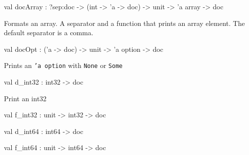 \documentclass[11pt]{article}
\begin{document}
\label{val:Pretty.docArray}\begin{ocamldoccode}
val docArray : ?sep:doc ->
  (int -> 'a -> doc) -> unit -> 'a array -> doc
\end{ocamldoccode}
\begin{ocamldocdescription}
Formats an array. A separator and a function that prints an array
    element. The default separator is a comma.


\end{ocamldocdescription}




\label{val:Pretty.docOpt}\begin{ocamldoccode}
val docOpt : ('a -> doc) -> unit -> 'a option -> doc
\end{ocamldoccode}
\begin{ocamldocdescription}
Prints an {\tt{'a option}} with {\tt{None}} or {\tt{Some}}


\end{ocamldocdescription}




\label{val:Pretty.d-underscoreint32}\begin{ocamldoccode}
val d_int32 : int32 -> doc
\end{ocamldoccode}
\begin{ocamldocdescription}
Print an int32


\end{ocamldocdescription}




\label{val:Pretty.f-underscoreint32}\begin{ocamldoccode}
val f_int32 : unit -> int32 -> doc
\end{ocamldoccode}




\label{val:Pretty.d-underscoreint64}\begin{ocamldoccode}
val d_int64 : int64 -> doc
\end{ocamldoccode}




\label{val:Pretty.f-underscoreint64}\begin{ocamldoccode}
val f_int64 : unit -> int64 -> doc
\end{ocamldoccode}
\end{document}
